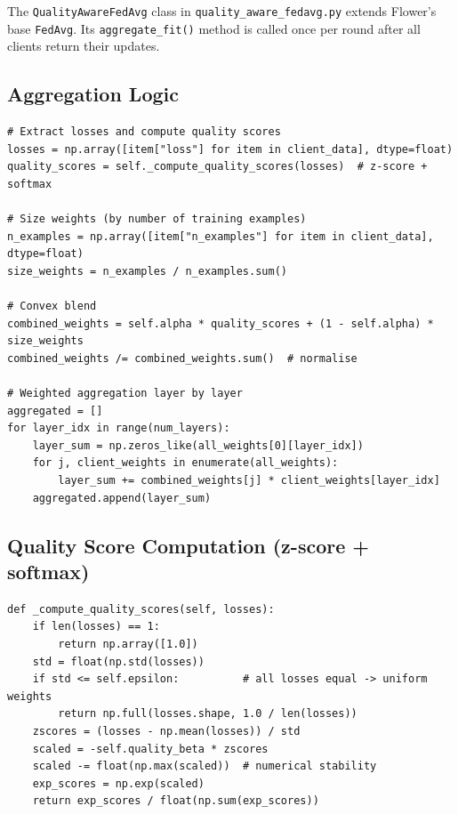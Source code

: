 \documentclass[12pt,a4paper]{article}
\begin{document}
The \texttt{QualityAwareFedAvg} class in \texttt{quality\_aware\_fedavg.py} extends Flower's base \texttt{FedAvg}. Its \texttt{aggregate\_fit()} method is called once per round after all clients return their updates.

\subsection{Aggregation Logic}

\begin{lstlisting}[caption={Core aggregation logic in QualityAwareFedAvg.aggregate\_fit()}]
# Extract losses and compute quality scores
losses = np.array([item["loss"] for item in client_data], dtype=float)
quality_scores = self._compute_quality_scores(losses)  # z-score + softmax

# Size weights (by number of training examples)
n_examples = np.array([item["n_examples"] for item in client_data], dtype=float)
size_weights = n_examples / n_examples.sum()

# Convex blend
combined_weights = self.alpha * quality_scores + (1 - self.alpha) * size_weights
combined_weights /= combined_weights.sum()  # normalise

# Weighted aggregation layer by layer
aggregated = []
for layer_idx in range(num_layers):
    layer_sum = np.zeros_like(all_weights[0][layer_idx])
    for j, client_weights in enumerate(all_weights):
        layer_sum += combined_weights[j] * client_weights[layer_idx]
    aggregated.append(layer_sum)
\end{lstlisting}

\subsection{Quality Score Computation (z-score + softmax)}

\begin{lstlisting}[caption={\_compute\_quality\_scores() in QualityAwareFedAvg}]
def _compute_quality_scores(self, losses):
    if len(losses) == 1:
        return np.array([1.0])
    std = float(np.std(losses))
    if std <= self.epsilon:          # all losses equal -> uniform weights
        return np.full(losses.shape, 1.0 / len(losses))
    zscores = (losses - np.mean(losses)) / std
    scaled = -self.quality_beta * zscores
    scaled -= float(np.max(scaled))  # numerical stability
    exp_scores = np.exp(scaled)
    return exp_scores / float(np.sum(exp_scores))
\end{lstlisting}
\end{document}
